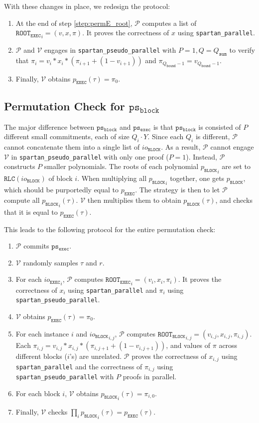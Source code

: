 \documentclass{article}
\newcommand{\code}{\texttt}
\newcommand{\Qbound}{Q_{\mathtt{bound}}}
\newcommand{\Qsum}{Q_{\mathtt{sum}}}
\renewcommand{\P}{\mathcal{P}}
\newcommand{\V}{\mathcal{V}}
\newcommand{\RLC}{\mathtt{RLC}}
\newcommand{\iob}{io_{\mathtt{BLOCK}}}
\newcommand{\ioe}{io_{\mathtt{EXEC}}}
\newcommand{\ROOTE}{\mathtt{ROOT_{EXEC}}}
\newcommand{\ROOTB}{\mathtt{ROOT_{BLOCK}}}
\newcommand{\psb}{\mathtt{ps_{block}}}
\newcommand{\pse}{\mathtt{ps_{exec}}}
\begin{document}
With these changes in place, we redesign the protocol:
\begin{enumerate}
    \item At the end of step \ref{step:permE_root}, $\P$ computes a list of $\ROOTE_i = (v, x, \pi)$. It proves the correctness of $x$ using \code{spartan\_parallel}.
    \item $\P$ and $\V$ engages in \code{spartan\_pseudo\_parallel} with $P = 1, Q = \Qsum$ to verify that $\pi_i = v_i * x_i * (\pi_{i+1} + (1 - v_{i+1}))$ and $\pi_{\Qbound - 1} = v_{\Qbound - 1}$.
    \item Finally, $\V$ obtains $p_\mathtt{EXEC}(\tau) = \pi_0$.
\end{enumerate}

\subsection{Permutation Check for $\psb$}

The major difference between $\psb$ and $\pse$ is that $\psb$ is consisted of $P$ different small commitments, each of size $Q_i\cdot Y$. Since each $Q_i$ is different, $\P$ cannot concatenate them into a single list of $\iob$. As a result, $\P$ cannot engage $\V$ in \code{spartan\_pseudo\_parallel} with only one proof ($P = 1$). Instead, $\P$ constructs $P$ smaller polynomials. The roots of each polynomial ${p_\mathtt{BLOCK}}_i$ are set to $\RLC(\iob)$ of block $i$. When multiplying all ${p_\mathtt{BLOCK}}_i$ together, one gets ${p_\mathtt{BLOCK}}$, which should be purportedly equal to ${p_\mathtt{EXEC}}$. The strategy is then to let $\P$ compute all ${p_\mathtt{BLOCK}}_i(\tau)$. $\V$ then multiplies them to obtain ${p_\mathtt{BLOCK}}(\tau)$, and checks that it is equal to ${p_\mathtt{EXEC}}(\tau)$.

This leads to the following protocol for the entire permutation check:
\begin{enumerate}
    \item $\P$ commits $\pse$.
    \item $\V$ randomly samples $\tau$ and $r$.
    \item For each ${\ioe}_i$, $\P$ computes $\ROOTE_i = (v_i, x_i, \pi_i)$. It proves the correctness of $x_i$ using \code{spartan\_parallel} and $\pi_i$ using \code{spartan\_pseudo\_parallel}.
    \item $\V$ obtains $p_\mathtt{EXEC}(\tau) = \pi_0$.
    \item For each instance $i$ and ${\iob}_{i, j}$, $\P$ computes $\ROOTB_{i, j} = (v_{i,j}, x_{i,j}, \pi_{i,j})$. Each $\pi_{i, j} = v_{i, j} * x_{i, j} * (\pi_{i, j+1} + (1 - v_{i, j+1}))$, and values of $\pi$ across different blocks ($i$'s) are unrelated. $\P$ proves the correctness of $x_{i, j}$ using \code{spartan\_parallel} and the correctness of $\pi_{i, j}$ using \code{spartan\_pseudo\_parallel} with $P$ proofs in parallel.
    \item For each block $i$, $\V$ obtains ${p_\mathtt{BLOCK}}_i(\tau) = \pi_{i, 0}$.
    \item Finally, $\V$ checks $\prod_i {p_\mathtt{BLOCK}}_i(\tau) = p_\mathtt{EXEC}(\tau)$.
\end{enumerate}
\end{document}
